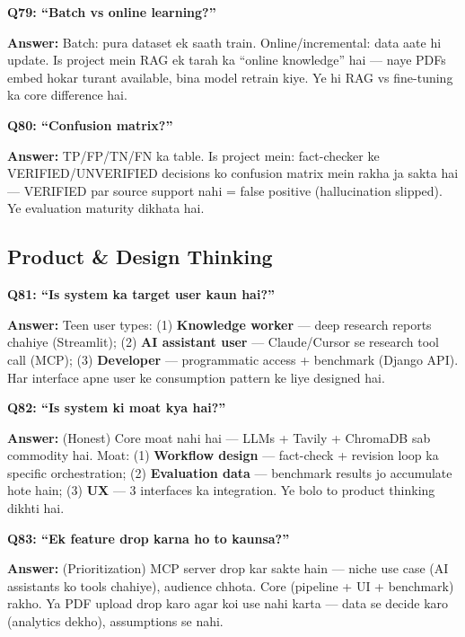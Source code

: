 \begin{interviewbox}
\textbf{Q79: ``Batch vs online learning?''}

\textbf{Answer:} Batch: pura dataset ek saath train. Online/incremental: data aate hi update. Is project mein RAG ek tarah ka ``online knowledge'' hai --- naye PDFs embed hokar turant available, bina model retrain kiye. Ye hi RAG vs fine-tuning ka core difference hai.
\end{interviewbox}

\begin{interviewbox}
\textbf{Q80: ``Confusion matrix?''}

\textbf{Answer:} TP/FP/TN/FN ka table. Is project mein: fact-checker ke VERIFIED/UNVERIFIED decisions ko confusion matrix mein rakha ja sakta hai --- VERIFIED par source support nahi = false positive (hallucination slipped). Ye evaluation maturity dikhata hai.
\end{interviewbox}

\subsection{Product \& Design Thinking}

\begin{interviewbox}
\textbf{Q81: ``Is system ka target user kaun hai?''}

\textbf{Answer:} Teen user types: (1) \textbf{Knowledge worker} --- deep research reports chahiye (Streamlit); (2) \textbf{AI assistant user} --- Claude/Cursor se research tool call (MCP); (3) \textbf{Developer} --- programmatic access + benchmark (Django API). Har interface apne user ke consumption pattern ke liye designed hai.
\end{interviewbox}

\begin{interviewbox}
\textbf{Q82: ``Is system ki moat kya hai?''}

\textbf{Answer:} (Honest) Core moat nahi hai --- LLMs + Tavily + ChromaDB sab commodity hai. Moat: (1) \textbf{Workflow design} --- fact-check + revision loop ka specific orchestration; (2) \textbf{Evaluation data} --- benchmark results jo accumulate hote hain; (3) \textbf{UX} --- 3 interfaces ka integration. Ye bolo to product thinking dikhti hai.
\end{interviewbox}

\begin{interviewbox}
\textbf{Q83: ``Ek feature drop karna ho to kaunsa?''}

\textbf{Answer:} (Prioritization) MCP server drop kar sakte hain --- niche use case (AI assistants ko tools chahiye), audience chhota. Core (pipeline + UI + benchmark) rakho. Ya PDF upload drop karo agar koi use nahi karta --- data se decide karo (analytics dekho), assumptions se nahi.
\end{interviewbox}

